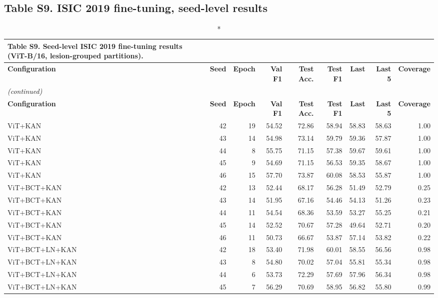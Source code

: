\documentclass[10pt]{article}
\begin{document}
\subsection*{Table S9. ISIC 2019 fine-tuning, seed-level results}
\scriptsize
\setlength{\tabcolsep}{3pt}
\begin{longtable}{lrrrrrrrr}
\caption*{\textbf{Table S9.} Seed-level ISIC 2019 fine-tuning results (ViT-B/16, lesion-grouped partitions).}\\
\toprule
\textbf{Configuration} & \textbf{Seed} & \textbf{Epoch} & \textbf{Val F1} & \textbf{Test Acc.} & \textbf{Test F1} & \textbf{Last} & \textbf{Last 5} & \textbf{Coverage} \\
\midrule
\endfirsthead
\multicolumn{9}{l}{\textit{(continued)}}\\
\toprule
\textbf{Configuration} & \textbf{Seed} & \textbf{Epoch} & \textbf{Val F1} & \textbf{Test Acc.} & \textbf{Test F1} & \textbf{Last} & \textbf{Last 5} & \textbf{Coverage} \\
\midrule
\endhead
\bottomrule
\endfoot
ViT+KAN & 42 & 19 & 54.52 & 72.86 & 58.94 & 58.83 & 58.63 & 1.00 \\
ViT+KAN & 43 & 14 & 54.98 & 73.14 & 59.79 & 59.36 & 57.87 & 1.00 \\
ViT+KAN & 44 & 8 & 55.75 & 71.15 & 57.38 & 59.67 & 59.61 & 1.00 \\
ViT+KAN & 45 & 9 & 54.69 & 71.15 & 56.53 & 59.35 & 58.67 & 1.00 \\
ViT+KAN & 46 & 15 & 57.70 & 73.87 & 60.08 & 58.53 & 55.87 & 1.00 \\
\midrule
ViT+BCT+KAN & 42 & 13 & 52.44 & 68.17 & 56.28 & 51.49 & 52.79 & 0.25 \\
ViT+BCT+KAN & 43 & 14 & 51.95 & 67.16 & 54.46 & 54.13 & 51.26 & 0.23 \\
ViT+BCT+KAN & 44 & 11 & 54.54 & 68.36 & 53.59 & 53.27 & 55.25 & 0.21 \\
ViT+BCT+KAN & 45 & 14 & 52.52 & 70.67 & 57.28 & 49.64 & 52.71 & 0.20 \\
ViT+BCT+KAN & 46 & 11 & 50.73 & 66.67 & 53.87 & 57.14 & 53.82 & 0.22 \\
\midrule
ViT+BCT+LN+KAN & 42 & 18 & 53.40 & 71.98 & 60.01 & 58.55 & 56.56 & 0.98 \\
ViT+BCT+LN+KAN & 43 & 8 & 54.80 & 70.02 & 57.04 & 55.81 & 55.34 & 0.98 \\
ViT+BCT+LN+KAN & 44 & 6 & 53.73 & 72.29 & 57.69 & 57.96 & 56.34 & 0.98 \\
ViT+BCT+LN+KAN & 45 & 7 & 56.29 & 70.69 & 58.95 & 56.82 & 55.80 & 0.99 \\

\end{longtable}
\end{document}
